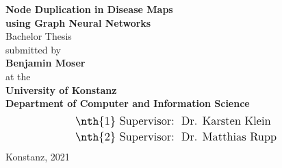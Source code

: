 \documentclass[
	fontsize=10pt, %
	twoside=false, %
	secnumdepth=1, %
  toc=indentunnumbered %
]{kaobook}
\begin{document}
\begin{titlepage}
  \begin{center}
    {\LARGE \textbf{Node Duplication in Disease Maps \\[0.7em] using Graph Neural Networks}}
    \\[2em]
    {\Large {Bachelor Thesis}}
    \\[5.5em]
    {\Large submitted by}
    \\[1.5em]
    {\LARGE \textbf{Benjamin Moser}}
    \\[1.5em]
    {\Large at the}
    \\[1.2em]
    {\Large \textbf{University of Konstanz}}
    \\[1.0em]
    {\Large \textbf{Department of Computer and Information Science}}
    \\[4em]
    \begin{align*}
      \text{\large {\nth{1} Supervisor}:~} &  \text{ \large Dr. Karsten Klein } \\
      \text{\large {\nth{2} Supervisor}:~} &  \text{ \large Dr. Matthias Rupp } \\
    \end{align*}
    \vfill
    {\Large {Konstanz, 2021}}
  \end{center}
\end{titlepage}











\frontmatter %


\end{document}
